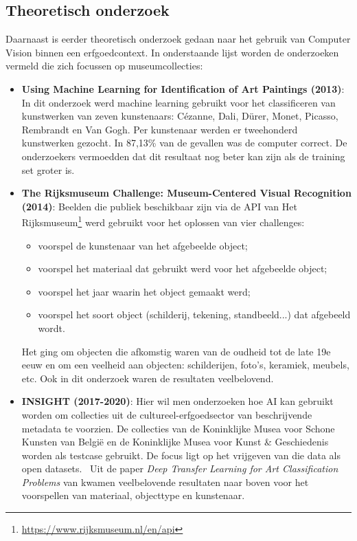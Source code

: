 \subsection{Theoretisch onderzoek}
Daarnaast is eerder theoretisch onderzoek gedaan naar het gebruik van Computer Vision binnen een erfgoedcontext. In onderstaande lijst worden de onderzoeken vermeld die zich focussen op museumcollecties:
\begin{itemize}
	\item \textbf{Using Machine Learning for Identification of Art Paintings (2013)}: In dit onderzoek werd machine learning gebruikt voor het classificeren van kunstwerken van zeven kunstenaars: C\'{e}zanne, Dali, D\"{u}rer, Monet, Picasso, Rembrandt en Van Gogh. Per kunstenaar werden er tweehonderd kunstwerken gezocht. In 87,13\% van de gevallen was de computer correct. De onderzoekers vermoedden dat dit resultaat nog beter kan zijn als de training set groter is.~\autocite{Blessings2013}

	\item \textbf{The Rijksmuseum Challenge: Museum-Centered Visual Recognition (2014)}: Beelden die publiek beschikbaar zijn via de API van Het Rijksmuseum\footnote{\url{https://www.rijksmuseum.nl/en/api}} werd gebruikt voor het oplossen van vier challenges:
	\begin{itemize}
		\item voorspel de kunstenaar van het afgebeelde object;
		\item voorspel het materiaal dat gebruikt werd voor het afgebeelde object;
		\item voorspel het jaar waarin het object gemaakt werd;
		\item voorspel het soort object (schilderij, tekening, standbeeld...) dat afgebeeld wordt.
	\end{itemize}
	Het ging om objecten die afkomstig waren van de oudheid tot de late 19e eeuw en om een veelheid aan objecten: schilderijen, foto's, keramiek, meubels, etc. Ook in dit onderzoek waren de resultaten veelbelovend.~\autocite{Mensink2014}

	\item \textbf{INSIGHT (2017-2020)}: Hier wil men onderzoeken hoe AI kan gebruikt worden om collecties uit de cultureel-erfgoedsector van beschrijvende metadata te voorzien. De collecties van de Koninklijke Musea voor Schone Kunsten van Belgi\"{e} en de Koninklijke Musea voor Kunst \& Geschiedenis worden als testcase gebruikt. De focus ligt op het vrijgeven van die data als open datasets.~\autocite{UniAntwerpen2017?} Uit de paper \emph{Deep Transfer Learning for Art Classification Problems} van \textcite{Sabatelli2018} kwamen veelbelovende resultaten naar boven voor het voorspellen van materiaal, objecttype en kunstenaar.


\end{itemize}
